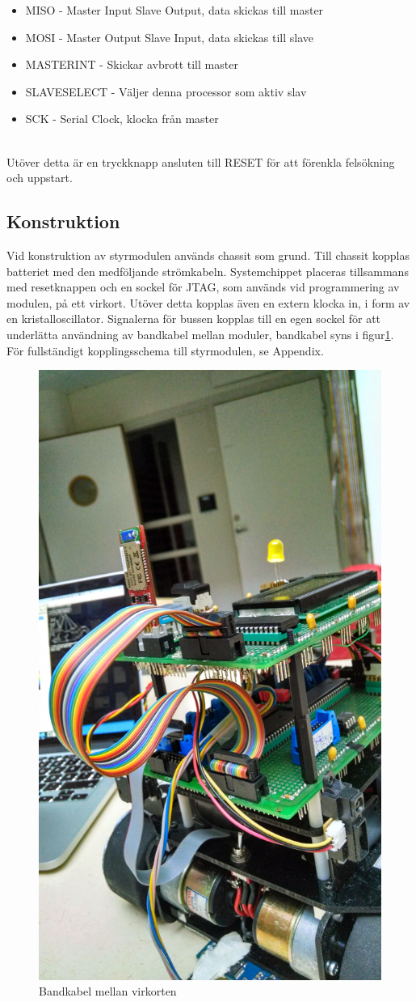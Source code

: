 \documentclass[a4paper,12pt,fleqn]{article}
\begin{document}
\begin{itemize}
	\item MISO - Master Input Slave Output, data skickas till master
	\item MOSI - Master Output Slave Input, data skickas till slave
	\item MASTERINT - Skickar avbrott till master
	\item SLAVESELECT - Väljer denna processor som aktiv slav
	\item SCK - Serial Clock, klocka från master
\end{itemize}
~\\
Utöver detta är en tryckknapp ansluten till RESET för att förenkla felsökning och uppstart. 

\newpage
\subsection{Konstruktion}

Vid konstruktion av styrmodulen används chassit som grund. Till chassit kopplas batteriet med den medföljande strömkabeln. Systemchippet placeras tillsammans med resetknappen och en sockel för JTAG, som används vid programmering av modulen, på ett virkort. Utöver detta kopplas även en extern klocka in, i form av en kristalloscillator. Signalerna för bussen kopplas till en egen sockel för att underlätta användning av bandkabel mellan moduler, bandkabel syns i figur\ref{fig:band}. För fullständigt kopplingsschema till styrmodulen, se Appendix. 

\begin{figure}[htp] %
  \begin{center}
  \includegraphics[keepaspectratio=true,width=0.5\linewidth]{bilder/robotbilder/Bandkabel.jpg}  %
  \end{center}
  \caption{Bandkabel mellan virkorten} %
  \label{fig:band}
\end{figure}
\end{document}

